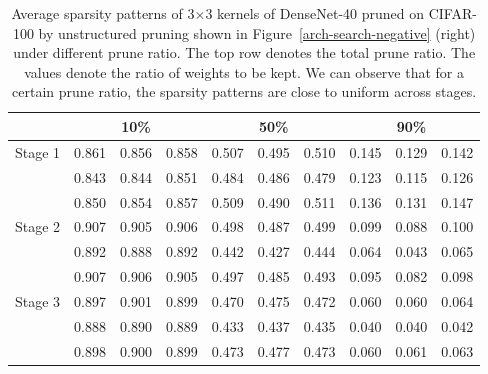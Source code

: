 \setlength{\tabcolsep}{5pt}
\renewcommand{\arraystretch}{1.2}
\begin{table}[!htbp]
\centering
\small
\begin{tabular}{c|ccc|ccc|ccl}
\hline
                         & \multicolumn{3}{c|}{10\%} & \multicolumn{3}{c|}{50\%} & \multicolumn{3}{c}{90\%} \\ \hline
\multirow{3}{*}{Stage 1} & 0.861   & 0.856  & 0.858  & 0.507   & 0.495  & 0.510  & 0.145  & 0.129  & 0.142  \\
                         & 0.843   & 0.844  & 0.851  & 0.484   & 0.486  & 0.479  & 0.123  & 0.115  & 0.126  \\
                         & 0.850   & 0.854  & 0.857  & 0.509   & 0.490  & 0.511  & 0.136  & 0.131  & 0.147  \\ \hline
\multirow{3}{*}{Stage 2} & 0.907   & 0.905  & 0.906  & 0.498   & 0.487  & 0.499  & 0.099  & 0.088  & 0.100  \\
                         & 0.892   & 0.888  & 0.892  & 0.442   & 0.427  & 0.444  & 0.064  & 0.043  & 0.065  \\
                         & 0.907   & 0.906  & 0.905  & 0.497   & 0.485  & 0.493  & 0.095  & 0.082  & 0.098  \\ \hline
\multirow{3}{*}{Stage 3} & 0.897   & 0.901  & 0.899  & 0.470   & 0.475  & 0.472  & 0.060  & 0.060  & 0.064  \\
                         & 0.888   & 0.890  & 0.889  & 0.433   & 0.437  & 0.435  & 0.040  & 0.040  & 0.042  \\
                         & 0.898   & 0.900  & 0.899  & 0.473   & 0.477  & 0.473  & 0.060  & 0.061  & 0.063  \\ \hline
\end{tabular}
  \caption{
      Average sparsity patterns of 3$\times$3 kernels of DenseNet-40 pruned on CIFAR-100 by unstructured pruning shown in Figure~\ref{arch-search-negative} (right) under different prune ratio. The top row denotes the total prune ratio. The values denote the ratio of weights to be kept. We can observe that for a certain prune ratio, the sparsity patterns are close to uniform across stages.}
\label{sparsity-8}
\end{table}

\clearpage

